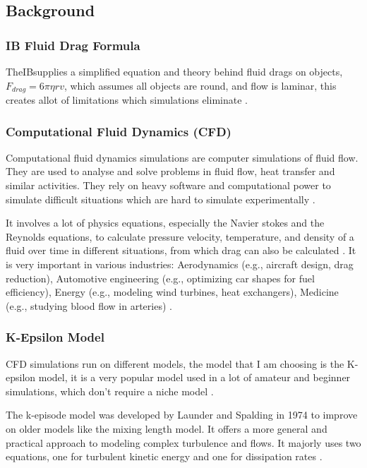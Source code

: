 \documentclass[12pt,a4paper]{article}
\begin{document}
\subsection{Background}

\subsubsection{IB Fluid Drag Formula}

TheIBsupplies a simplified equation and theory behind fluid drags on objects, $F_{drag} = 6\pi\eta rv$, which assumes all objects are round, and flow is laminar, this creates allot of limitations which simulations eliminate \cite{tsokos2014physics}.

\subsubsection{Computational Fluid Dynamics (CFD)}

Computational fluid dynamics simulations are computer simulations of fluid flow. They are used to analyse and solve problems in fluid flow, heat transfer and similar activities. They rely on heavy software and computational power to simulate difficult situations which are hard to simulate experimentally \cite{versteeg2007computational}. 

It involves a lot of physics equations, especially the Navier stokes and the Reynolds equations, to calculate pressure velocity, temperature, and density of a fluid over time in different situations, from which drag can also be calculated \cite{white2015fluid}. It is very important in various industries: Aerodynamics (e.g., aircraft design, drag reduction), Automotive engineering (e.g., optimizing car shapes for fuel efficiency), Energy (e.g., modeling wind turbines, heat exchangers), Medicine (e.g., studying blood flow in arteries) \cite{anderson2016fundamentals}.

\subsubsection{K-Epsilon Model}

CFD simulations run on different models, the model that I am choosing is the K-epsilon model, it is a very popular model used in a lot of amateur and beginner simulations, which don't require a niche model \cite{blazek2015computational}.

The k-episode model was developed by Launder and Spalding in 1974 to improve on older models like the mixing length model. It offers a more general and practical approach to modeling complex turbulence and flows. It majorly uses two equations, one for turbulent kinetic energy and one for dissipation rates \cite{launder1974application}.
\end{document}
